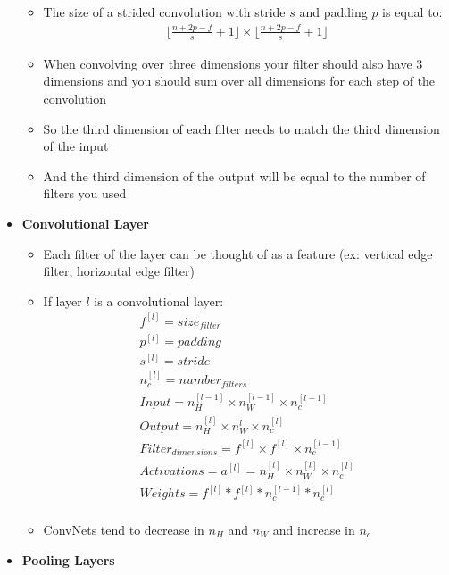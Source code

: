 \documentclass[12pt]{article}
\begin{document}
\begin{itemize}
\begin{itemize}
        \item The size of a strided convolution with stride $s$ and padding $p$ is equal to:
        \begin{gather*}
            \lfloor\frac{n + 2p - f}{s} + 1\rfloor \times \lfloor\frac{n + 2p - f}{s} + 1\rfloor
        \end{gather*}
        \item When convolving over three dimensions your filter should also have 3 dimensions and
        you should sum over all dimensions for each step of the convolution
        \item So the third dimension of each filter needs to match the third dimension of the input
        \item And the third dimension of the output will be equal to the number of filters you used
    \end{itemize}
    \item \textbf{Convolutional Layer}
    \begin{itemize}
        \item Each filter of the layer can be thought of as a feature (ex: vertical edge filter, horizontal edge filter) 
        \item If layer $l$ is a convolutional layer:
        \begin{gather*}
            f^{[l]} = size_{filter} \\
            p^{[l]} = padding \\
            s^{[l]} = stride \\
            n_c^{[l]} = number_{filters} \\
            Input = n_H^{[l-1]} \times n_W^{[l-1]} \times n_c^{[l-1]} \\
            Output = n_H^{[l]} \times n_W^{l} \times n_c^{[l]} \\
            Filter_{dimensions} = f^{[l]} \times f^{[l]} \times n_c^{[l-1]} \\
            Activations = a^{[l]} = n_H^{[l]} \times n_W^{[l]} \times n_c^{[l]} \\
            Weights = f^{[l]} * f^{[l]} * n_c^{[l-1]} * n_c^{[l]} \\
        \end{gather*}
        \item ConvNets tend to decrease in $n_H$ and $n_W$ and increase in $n_c$
    \end{itemize}
    \item \textbf{Pooling Layers}
    \begin{itemize}

\end{itemize}
\end{itemize}
\end{document}
